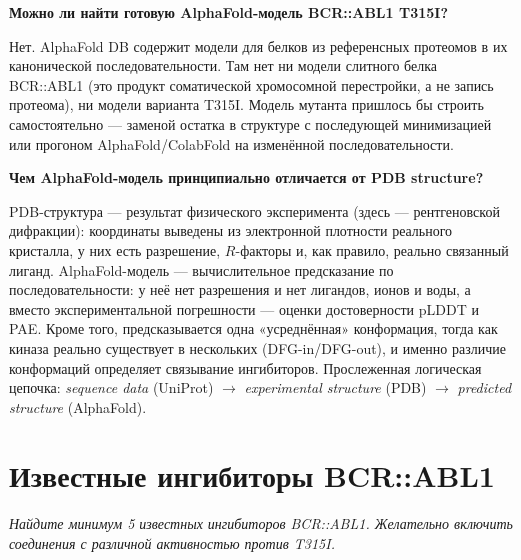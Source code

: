 \documentclass[11pt,a4paper]{article}
\newcommand{\instr}[1]{{\small\itshape #1\par}}
\begin{document}
\textbf{Можно ли найти готовую AlphaFold-модель BCR::ABL1 T315I?}

Нет. AlphaFold DB содержит модели для белков из референсных протеомов в их канонической
последовательности. Там нет ни модели слитного белка BCR::ABL1 (это продукт соматической
хромосомной перестройки, а не запись протеома), ни модели варианта T315I. Модель мутанта
пришлось бы строить самостоятельно --- заменой остатка в структуре с последующей
минимизацией или прогоном AlphaFold/ColabFold на изменённой последовательности.

\textbf{Чем AlphaFold-модель принципиально отличается от PDB structure?}

PDB-структура --- результат физического эксперимента (здесь --- рентгеновской
дифракции): координаты выведены из электронной плотности реального кристалла, у них есть
разрешение, $R$-факторы и, как правило, реально связанный лиганд. AlphaFold-модель ---
вычислительное предсказание по последовательности: у неё нет разрешения и нет лигандов,
ионов и воды, а вместо экспериментальной погрешности --- оценки достоверности pLDDT и
PAE. Кроме того, предсказывается одна «усреднённая» конформация, тогда как киназа реально
существует в нескольких (DFG-in/DFG-out), и именно различие конформаций определяет
связывание ингибиторов. Прослеженная логическая цепочка: \emph{sequence data} (UniProt)
$\rightarrow$ \emph{experimental structure} (PDB) $\rightarrow$ \emph{predicted
structure} (AlphaFold).

\section{Известные ингибиторы BCR::ABL1}
\instr{Найдите минимум 5 известных ингибиторов BCR::ABL1. Желательно включить соединения
с различной активностью против T315I.}
\end{document}
